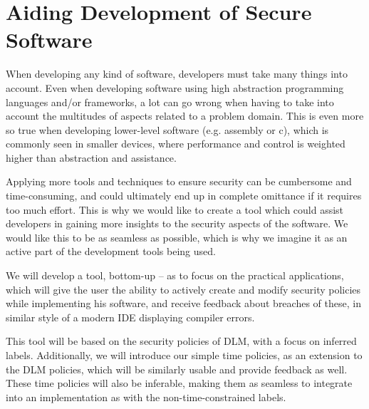 
\section{Aiding Development of Secure Software}
When developing any kind of software, developers must take many things into account.
Even when developing software using high abstraction programming languages and/or frameworks, a lot can go wrong when having to take into account the multitudes of aspects related to a problem domain.
This is even more so true when developing lower-level software (e.g. assembly or c), which is commonly seen in smaller devices, where performance and control is weighted higher than abstraction and assistance.

Applying more tools and techniques to ensure security can be cumbersome and time-consuming, and could ultimately end up in complete omittance if it requires too much effort.
This is why we would like to create a tool which could assist developers in gaining more insights to the security aspects of the software.
We would like this to be as seamless as possible, which is why we imagine it as an active part of the development tools being used.

We will develop a tool, bottom-up -- as to focus on the practical applications, which will give the user the ability to actively create and modify security policies while implementing his software, and receive feedback about breaches of these, in similar style of a modern IDE displaying compiler errors.

This tool will be based on the security policies of DLM, with a focus on inferred labels.
Additionally, we will introduce our simple time policies, as an extension to the DLM policies, which will be similarly usable and provide feedback as well.
These time policies will also be inferable, making them as seamless to integrate into an implementation as with the non-time-constrained labels.
